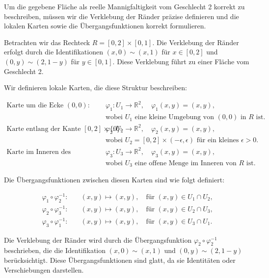Um die gegebene Fläche als reelle Mannigfaltigkeit vom Geschlecht 2 korrekt zu beschreiben, müssen wir die Verklebung der Ränder präzise definieren und die lokalen Karten sowie die Übergangsfunktionen korrekt formulieren.

Betrachten wir das Rechteck $R = [0, 2] \times [0, 1]$. Die Verklebung der Ränder erfolgt durch die Identifikationen $(x, 0) \sim (x, 1)$ für $x \in [0, 2]$ und $(0, y) \sim (2, 1-y)$ für $y \in [0, 1]$. Diese Verklebung führt zu einer Fläche vom Geschlecht 2.

Wir definieren lokale Karten, die diese Struktur beschreiben:

\begin{align*}
\text{Karte um die Ecke } (0,0): \quad & \varphi_1: U_1 \to \mathbb{R}^2, \quad \varphi_1(x,y) = (x,y), \\
& \text{wobei } U_1 \text{ eine kleine Umgebung von } (0,0) \text{ in } R \text{ ist.} \\
\text{Karte entlang der Kante } [0,2] \times \{0\}: \quad & \varphi_2: U_2 \to \mathbb{R}^2, \quad \varphi_2(x,y) = (x,y), \\
& \text{wobei } U_2 = [0,2] \times (-\epsilon, \epsilon) \text{ für ein kleines } \epsilon > 0. \\
\text{Karte im Inneren des Rechtecks:} \quad & \varphi_3: U_3 \to \mathbb{R}^2, \quad \varphi_3(x,y) = (x,y), \\
& \text{wobei } U_3 \text{ eine offene Menge im Inneren von } R \text{ ist.}
\end{align*}

Die Übergangsfunktionen zwischen diesen Karten sind wie folgt definiert:

\begin{align*}
\varphi_1 \circ \varphi_2^{-1}: \quad & (x,y) \mapsto (x,y), \quad \text{für } (x,y) \in U_1 \cap U_2, \\
\varphi_2 \circ \varphi_3^{-1}: \quad & (x,y) \mapsto (x,y), \quad \text{für } (x,y) \in U_2 \cap U_3, \\
\varphi_3 \circ \varphi_1^{-1}: \quad & (x,y) \mapsto (x,y), \quad \text{für } (x,y) \in U_3 \cap U_1.
\end{align*}

Die Verklebung der Ränder wird durch die Übergangsfunktion $\varphi_2 \circ \varphi_2^{-1}$ beschrieben, die die Identifikation $(x, 0) \sim (x, 1)$ und $(0, y) \sim (2, 1-y)$ berücksichtigt. Diese Übergangsfunktionen sind glatt, da sie Identitäten oder Verschiebungen darstellen.

